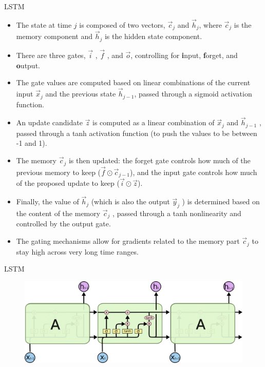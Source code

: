 \documentclass[handout]{beamer}
\begin{document}
\begin{frame}{LSTM}
\begin{scriptsize}

\begin{itemize}
\item The state at time $j$ is composed of two vectors, $\vec{c}_j$ and $\vec{h}_{j}$, where $\vec{c}_j$ is the memory component and $\vec{h}_j$ is the hidden state component.
\item There are three gates, $\vec{i}$ , $\vec{f}$ , and $\vec{o}$, controlling for \textbf{i}nput, \textbf{f}orget, and \textbf{o}utput.
\item The gate values are computed based on linear combinations of the current input $\vec{x}_j$ and the previous state $\vec{h}_{j-1}$, passed through a sigmoid activation function.
\item An update candidate $\vec{z}$ is computed as a linear combination of $\vec{x}_j$ and $\vec{h}_{j-1}$ , passed through a tanh activation function (to push the values to be between -1 and 1).
\item The memory $\vec{c}_j$ is then updated: the forget gate controls how much of the previous memory to keep ($\vec{f} \odot \vec{c}_{j-1}$), and the input gate controls how much of the proposed update to keep ($\vec{i} \odot  \vec{z}$). 
\item Finally, the value of $\vec{h}_j$ (which is also the output $\vec{y}_j$ ) is determined based on the content of the memory $\vec{c}_j$ , passed through a tanh nonlinearity and controlled by the output gate. 
\item The gating mechanisms allow for gradients related to the memory part $\vec{c}_j$ to stay high across very long time ranges.
\end{itemize}
\end{scriptsize}
\end{frame}



\begin{frame}{LSTM}
  \begin{figure}[h]
        	\includegraphics[scale = 0.35]{pics/LSTMchain.png}
        \end{figure}
\end{frame}
\end{document}
